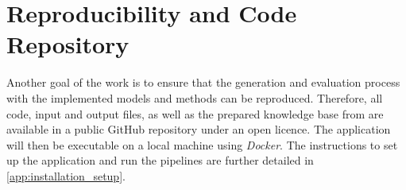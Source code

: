 \section{Reproducibility and Code Repository}\label{sec:reproducibility_approach}

Another goal of the work is to ensure that the generation and evaluation process with the implemented models and methods can be reproduced.
Therefore, all code, input and output files, as well as the prepared knowledge base from \citet{bb2} are available in a public GitHub repository under an open licence.
The application will then be executable on a local machine using \textit{Docker}.
The instructions to set up the application and run the pipelines are further detailed in \cref{app:installation_setup}.
%


